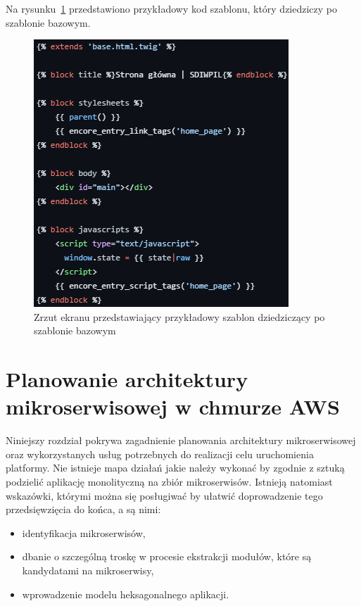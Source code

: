\documentclass[12pt,oneside]{book}
\newcommand{\captionvspace}{\vspace{6pt}}
\begin{document}
    Na rysunku~\ref{fig:twig-inheriting-template} przedstawiono przykładowy kod szablonu, który dziedziczy po szablonie bazowym.

    \begin{figure}[ht]
        \centering
        \includegraphics[width=\textwidth]{includes/images/twig-inheriting-template.png}
        \captionvspace
        \caption{Zrzut ekranu przedstawiający przykładowy szablon dziedziczący po szablonie bazowym}
        \label{fig:twig-inheriting-template}
    \end{figure}


    \chapter{Planowanie architektury mikroserwisowej w chmurze AWS}
    Niniejszy rozdział pokrywa zagadnienie planowania architektury mikroserwisowej oraz wykorzystanych usług potrzebnych do realizacji celu uruchomienia platformy. Nie istnieje mapa działań jakie należy wykonać by zgodnie z sztuką podzielić aplikację monolityczną na zbiór mikroserwisów. Istnieją natomiast wskazówki, którymi można się posługiwać by ułatwić doprowadzenie tego przedsięwzięcia do końca, a są nimi:

    \begin{itemize}
        \item identyfikacja mikroserwisów,
        \item dbanie o szczególną troskę w procesie ekstrakcji modułów, które są kandydatami na mikroserwisy,
        \item wprowadzenie modelu heksagonalnego aplikacji. \cite{java.ee.8.design.patterns}
    \end{itemize}
\end{document}
